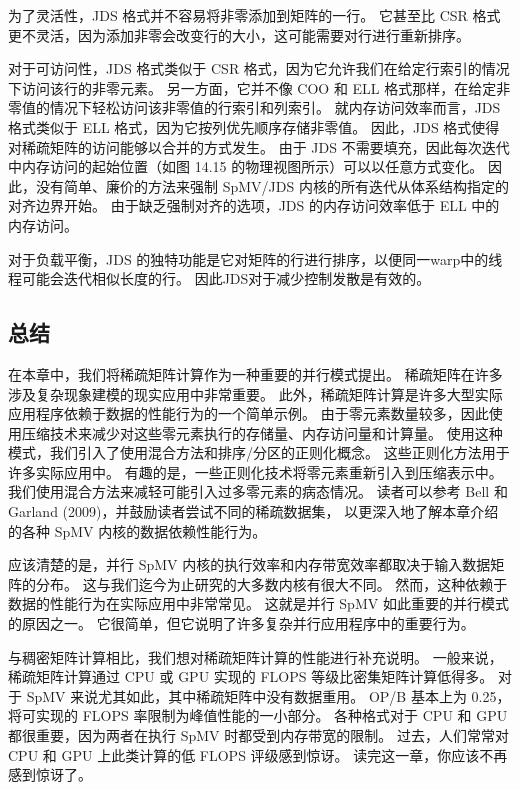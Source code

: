 为了灵活性，JDS 格式并不容易将非零添加到矩阵的一行。 
它甚至比 CSR 格式更不灵活，因为添加非零会改变行的大小，这可能需要对行进行重新排序。

对于可访问性，JDS 格式类似于 CSR 格式，因为它允许我们在给定行索引的情况下访问该行的非零元素。 
另一方面，它并不像 COO 和 ELL 格式那样，在给定非零值的情况下轻松访问该非零值的行索引和列索引。 
就内存访问效率而言，JDS 格式类似于 ELL 格式，因为它按列优先顺序存储非零值。 
因此，JDS 格式使得对稀疏矩阵的访问能够以合并的方式发生。 
由于 JDS 不需要填充，因此每次迭代中内存访问的起始位置（如图 14.15 的物理视图所示）可以以任意方式变化。 
因此，没有简单、廉价的方法来强制 SpMV/JDS 内核的所有迭代从体系结构指定的对齐边界开始。 
由于缺乏强制对齐的选项，JDS 的内存访问效率低于 ELL 中的内存访问。

对于负载平衡，JDS 的独特功能是它对矩阵的行进行排序，以便同一warp中的线程可能会迭代相似长度的行。 
因此JDS对于减少控制发散是有效的。

\subsection{总结}
在本章中，我们将稀疏矩阵计算作为一种重要的并行模式提出。 稀疏矩阵在许多涉及复杂现象建模的现实应用中非常重要。 
此外，稀疏矩阵计算是许多大型实际应用程序依赖于数据的性能行为的一个简单示例。 
由于零元素数量较多，因此使用压缩技术来减少对这些零元素执行的存储量、内存访问量和计算量。 
使用这种模式，我们引入了使用混合方法和排序/分区的正则化概念。 这些正则化方法用于许多实际应用中。 
有趣的是，一些正则化技术将零元素重新引入到压缩表示中。 我们使用混合方法来减轻可能引入过多零元素的病态情况。 
读者可以参考 Bell 和 Garland (2009)，并鼓励读者尝试不同的稀疏数据集，
以更深入地了解本章介绍的各种 SpMV 内核的数据依赖性能行为。

应该清楚的是，并行 SpMV 内核的执行效率和内存带宽效率都取决于输入数据矩阵的分布。 
这与我们迄今为止研究的大多数内核有很大不同。 然而，这种依赖于数据的性能行为在实际应用中非常常见。 
这就是并行 SpMV 如此重要的并行模式的原因之一。 它很简单，但它说明了许多复杂并行应用程序中的重要行为。

与稠密矩阵计算相比，我们想对稀疏矩阵计算的性能进行补充说明。 
一般来说，稀疏矩阵计算通过 CPU 或 GPU 实现的 FLOPS 等级比密集矩阵计算低得多。 
对于 SpMV 来说尤其如此，其中稀疏矩阵中没有数据重用。 OP/B 基本上为 0.25，将可实现的 FLOPS 率限制为峰值性能的一小部分。 
各种格式对于 CPU 和 GPU 都很重要，因为两者在执行 SpMV 时都受到内存带宽的限制。 
过去，人们常常对 CPU 和 GPU 上此类计算的低 FLOPS 评级感到惊讶。 读完这一章，你应该不再感到惊讶了。